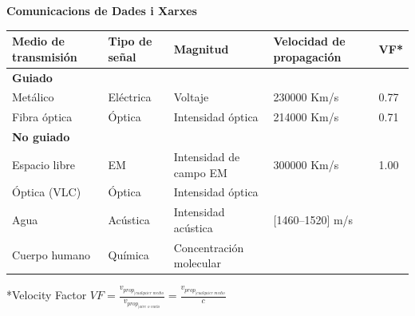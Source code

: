 \documentclass[10pt,a4paper]{article}
\begin{document}
\begin{center}
    {\Large \textbf{Comunicacions de Dades i Xarxes}} \\[4pt]
    \small %
\end{center}


\begin{table}[h!]
    \centering
    \begin{tabular}{lllll}
        \hline
        \textbf{Medio de transmisión} & \textbf{Tipo de señal} & \textbf{Magnitud} & \textbf{Velocidad de propagación} & \textbf{VF*} \\ \hline
        \multicolumn{5}{l}{\textbf{Guiado}} \\ 
            Metálico & Eléctrica & Voltaje & 230000 Km/s & 0.77 \\
            Fibra óptica & Óptica & Intensidad óptica & 214000 Km/s & 0.71 \\ \hline
        \multicolumn{5}{l}{\textbf{No guiado}} \\ 
            Espacio libre & EM & Intensidad de campo EM & 300000 Km/s & 1.00 \\
            Óptica (VLC) & Óptica & Intensidad óptica &  &  \\
            Agua & Acústica & Intensidad acústica & [1460–1520] m/s &  \\
            Cuerpo humano & Química & Concentración molecular &  &  \\ \hline
    \end{tabular}
    \begin{minipage}{0.8\linewidth}
        \footnotesize
        *Velocity Factor $\textit{VF} = \frac{v_{\textit{prop}_{\vert\textit{cualquier medio}}}}{v_{\textit{prop}_{\vert\textit{aire o vacío}}}} = \frac{v_{\textit{prop}_{\vert\textit{cualquier medio}}}}{c}$
    \end{minipage}
\end{table}
\end{document}
